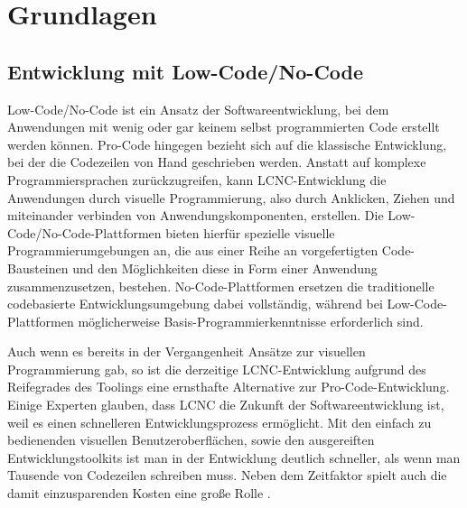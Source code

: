 
\chapter{Grundlagen} \label{GL}

\section{Entwicklung mit Low-Code/No-Code} 

Low-Code/No-Code ist ein Ansatz der Softwareentwicklung, bei dem Anwendungen mit wenig oder gar keinem selbst programmierten Code erstellt werden können. Pro-Code hingegen bezieht sich auf die klassische Entwicklung, bei der die Codezeilen von Hand geschrieben werden. Anstatt auf komplexe Programmiersprachen zurückzugreifen, kann LCNC-Entwicklung die Anwendungen durch visuelle Programmierung, also durch Anklicken, Ziehen und miteinander verbinden von Anwendungskomponenten, erstellen. Die Low-Code/No-Code-Plattformen bieten hierfür spezielle visuelle Programmierumgebungen an, die aus einer Reihe an vorgefertigten Code-Bausteinen und den Möglichkeiten diese in Form einer Anwendung zusammenzusetzen, bestehen. No-Code-Plattformen ersetzen die traditionelle codebasierte Entwicklungsumgebung dabei vollständig, während bei Low-Code-Plattformen möglicherweise Basis-Programmierkenntnisse erforderlich sind.
 
Auch wenn es bereits in der Vergangenheit Ansätze zur visuellen Programmierung gab, so ist die derzeitige LCNC-Entwicklung aufgrund des Reifegrades des Toolings eine ernsthafte Alternative zur Pro-Code-Entwicklung. Einige Experten glauben, dass LCNC die Zukunft der Softwareentwicklung ist, weil es einen schnelleren Entwicklungsprozess ermöglicht. Mit den einfach zu bedienenden visuellen Benutzeroberflächen, sowie den ausgereiften Entwicklungstoolkits ist man in der Entwicklung deutlich schneller, als wenn man Tausende von Codezeilen schreiben muss. Neben dem Zeitfaktor spielt auch die damit einzusparenden Kosten eine große Rolle \cite{lcnc:zlcp}.

